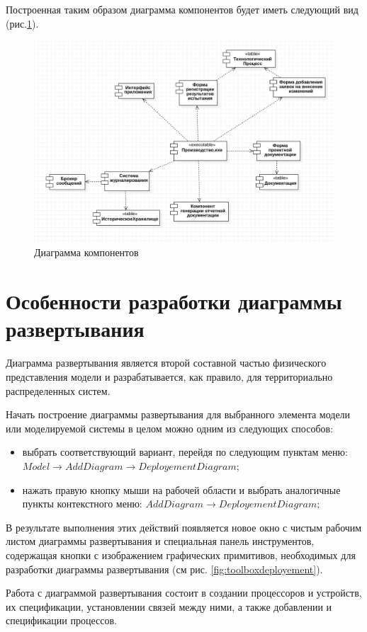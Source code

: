 \documentclass[a4paper,12pt]{extreport}
\begin{document}
Построенная таким образом диаграмма компонентов будет иметь следующий вид (рис.\ref{fig:componentsfull}).
\begin{figure}[h!]
	\centering
	\includegraphics[width=0.7\linewidth]{images/componentsfull}
	\caption{Диаграмма компонентов}
	\label{fig:componentsfull}
\end{figure}

\section{Особенности разработки диаграммы развертывания}
Диаграмма развертывания является второй составной частью физического представления модели и разрабатывается, как правило, для территориально распределенных систем. 

Начать построение диаграммы развертывания для выбранного элемента модели или моделируемой системы в целом можно одним из следующих способов:
\begin{itemize}
	\item выбрать соответствующий вариант, перейдя по следующим пунктам меню: \\$Model \to Add Diagram \to Deployement Diagram$;
	\item нажать правую кнопку мыши на рабочей области и выбрать аналогичные пункты контекстного меню: $Add Diagram \to Deployement Diagram$;
\end{itemize}

В результате выполнения этих действий появляется новое окно с чистым рабочим листом диаграммы развертывания и специальная панель инструментов, содержащая кнопки с изображением графических примитивов, необходимых для разработки диаграммы развертывания (см рис. \ref{fig:toolboxdeployement}).

Работа с диаграммой развертывания состоит в создании процессоров и устройств, их спецификации, установлении связей между ними, а также добавлении и спецификации процессов.
\end{document}
